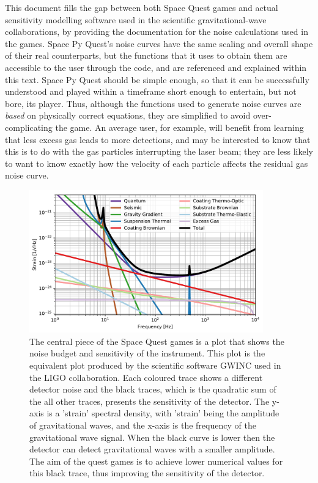 \documentclass{article}
\begin{document}
This document fills the gap between both Space Quest games and actual
sensitivity modelling software used in the scientific gravitational-wave
collaborations, by providing the documentation for the noise
calculations used in the games. Space Py Quest's noise curves have the
same scaling and overall shape of their real counterparts, but the
functions that it uses to obtain them are accessible to the user
through the code, and are referenced and explained within this
text. Space Py Quest should be simple enough, so that it can be
successfully understood and played within a timeframe short enough to
entertain, but not bore, its player. Thus, although the functions used
to generate noise curves are \textit{based} on physically correct
equations, they are simplified to avoid over-complicating the game. An
average user, for example, will benefit from learning that less excess
gas leads to more detections, and may be interested to know that this
is to do with the gas particles interrupting the laser beam; they are
less likely to want to know exactly how the velocity of each particle
affects the  residual gas noise curve.
\begin{figure}[htb]
        \centering
         \includegraphics[width=0.9\textwidth]{gwinc_aLIGO.pdf}
\caption{The central piece of the Space Quest games is a plot that
  shows the noise budget and sensitivity of the instrument. This plot
  is the equivalent plot produced by the scientific software GWINC
  used in the LIGO collaboration. Each coloured trace
  shows a different detector noise and the black traces, which is the
  quadratic sum of the all other traces, presents the sensitivity of
  the detector. The y-axis is a  'strain' spectral density,
  with 'strain' being the amplitude of gravitational
  waves, and the x-axis is the frequency of the gravitational wave
  signal. When the black curve is lower then the detector can 
  detect gravitational waves with a smaller amplitude.
  The aim of the quest games is to achieve lower
  numerical values for this black trace, thus improving the
  sensitivity of the detector.}\label{fig:GWINC_LIGO}
\end{figure}
\end{document}
